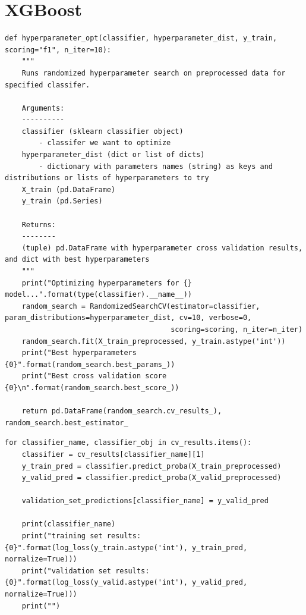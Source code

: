 \documentclass[12pt,a4paper]{report}
\theoremstyle{definition}
\begin{document}
\section{XGBoost}

\begin{lstlisting}[label=code:HyperParamXG,  caption={Hyperparameter optimisation for XGBoost classifier}]
def hyperparameter_opt(classifier, hyperparameter_dist, y_train, scoring="f1", n_iter=10):
    """
    Runs randomized hyperparameter search on preprocessed data for specified classifer.

    Arguments:
    ----------
    classifier (sklearn classifier object)
        - classifer we want to optimize
    hyperparameter_dist (dict or list of dicts)
        - dictionary with parameters names (string) as keys and distributions or lists of hyperparameters to try
    X_train (pd.DataFrame)
    y_train (pd.Series)

    Returns:
    --------
    (tuple) pd.DataFrame with hyperparameter cross validation results, and dict with best hyperparameters
    """
    print("Optimizing hyperparameters for {} model...".format(type(classifier).__name__))
    random_search = RandomizedSearchCV(estimator=classifier, param_distributions=hyperparameter_dist, cv=10, verbose=0,
                                       scoring=scoring, n_iter=n_iter)
    random_search.fit(X_train_preprocessed, y_train.astype('int'))
    print("Best hyperparameters {0}".format(random_search.best_params_))
    print("Best cross validation score {0}\n".format(random_search.best_score_))

    return pd.DataFrame(random_search.cv_results_), random_search.best_estimator_
\end{lstlisting}

\begin{lstlisting}[label=code:LogLossXG,  caption={Compare log loss of training and validation sets for XGBoost classifier}]
for classifier_name, classifier_obj in cv_results.items():
    classifier = cv_results[classifier_name][1]
    y_train_pred = classifier.predict_proba(X_train_preprocessed)
    y_valid_pred = classifier.predict_proba(X_valid_preprocessed)

    validation_set_predictions[classifier_name] = y_valid_pred

    print(classifier_name)
    print("training set results: {0}".format(log_loss(y_train.astype('int'), y_train_pred, normalize=True)))
    print("validation set results: {0}".format(log_loss(y_valid.astype('int'), y_valid_pred, normalize=True)))
    print("")
\end{lstlisting}
\end{document}

